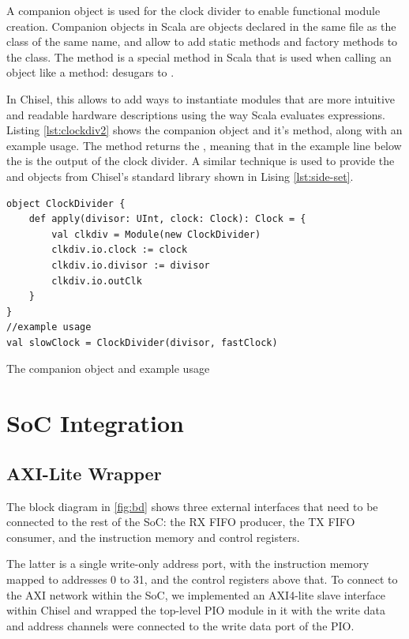 A companion object is used for the clock divider to enable functional module creation. Companion objects in Scala are objects declared in the same file as the class of the same name, and allow to add static methods and factory methods to the class. The  method is a special method in Scala that is used when calling an object like a method:  desugars to  \cite{scala_book}.

In Chisel, this allows to add ways to instantiate modules that are more intuitive and readable hardware descriptions using the way Scala evaluates expressions. Listing \ref{lst:clockdiv2} shows the  companion object and it's  method, along with an example usage. The method returns the , meaning that in the example line below the  is the output of the clock divider. A similar technique is used to provide the  and  objects from Chisel's standard library shown in Lising \ref{lst:side-set}.

\begin{listing}[h!]
    \centering
    \vspace{0.5cm}
    \begin{verbatim}
object ClockDivider {
    def apply(divisor: UInt, clock: Clock): Clock = {
        val clkdiv = Module(new ClockDivider)
        clkdiv.io.clock := clock
        clkdiv.io.divisor := divisor
        clkdiv.io.outClk
    }
}
//example usage
val slowClock = ClockDivider(divisor, fastClock)
    \end{verbatim}
    \caption{The  companion object and example usage}
    \label{lst:clockdiv2}
\end{listing}

\section{SoC Integration}

\subsection{AXI-Lite Wrapper}

The block diagram in \ref{fig:bd} shows three external interfaces that need to be connected to the rest of the SoC: the RX FIFO producer, the TX FIFO consumer, and the instruction memory and control registers.

The latter is a single write-only address port, with the instruction memory mapped to addresses 0 to 31, and the control registers above that. To connect to the AXI network within the SoC, we implemented an AXI4-lite slave interface within Chisel and wrapped the top-level PIO module in it with the write data and address channels were connected to the write data port of the PIO.

